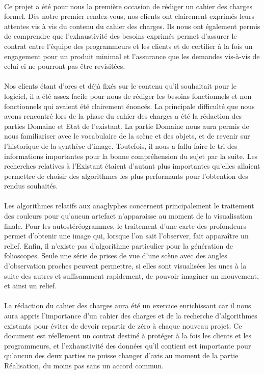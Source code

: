 \paragraph{}
Ce projet a été pour nous la première occasion de rédiger un cahier des charges formel. Dès notre premier rendez-vous, nos clients ont clairement exprimés leurs attentes vis à vis du contenu du cahier des charges. Ils nous ont également permis de comprendre que l'exhaustivité des besoins exprimés permet d'assurer le contrat entre l'équipe des programmeurs et les clients et de certifier à la fois un engagement pour un produit minimal et l'assurance que les demandes vis-à-vis de celui-ci ne pourront pas être revisitées.

\paragraph{}
Nos clients étant d'ores et déjà fixés sur le contenu qu'il souhaitait pour le logiciel, il a été assez facile pour nous de rédiger les besoins fonctionnels et non fonctionnels qui avaient été clairement énoncés. La principale difficulté que nous avons rencontré lors de la phase du cahier des charges a été la rédaction des parties Domaine et Etat de l'existant.
La partie Domaine nous aura permis de nous familiariser avec le vocabulaire de la scène et des objets, et de revenir sur l'historique de la synthèse d'image. Toutefois, il nous a fallu faire le tri des informations importantes pour la bonne compréhension du sujet par la suite.
Les recherches relatives à l'Existant étaient d'autant plus importantes qu'elles allaient permettre de choisir des algorithmes les plus performants pour l'obtention des rendus souhaités.

\paragraph{}
Les algorithmes relatifs aux anaglyphes concernent principalement le traitement des couleurs pour qu'aucun artefact n'apparaisse au moment de la visualisation finale. Pour les autostéréogrammes, le traitement d'une carte des profondeurs permet d'obtenir une image qui, lorsque l'on sait l'observer, fait apparaître un relief. Enfin, il n'existe pas d'algorithme particulier pour la génération de folioscopes. Seule une série de prises de vue d'une scène avec des angles d'observation proches peuvent permettre, si elles sont visualisées les unes à la suite des autres et suffisamment rapidement, de pouvoir imaginer un mouvement, et ainsi un relief.

\paragraph{}
La rédaction du cahier des charges aura été un exercice enrichissant car il nous aura appris l'importance d'un cahier des charges et de la recherche d'algorithmes existants pour éviter de devoir repartir de zéro à chaque nouveau projet. Ce document est réellement un contrat destiné à protéger à la fois les clients et les programmeurs, et l'exhaustivité des données qu'il contient est importante pour qu'aucun des deux parties ne puisse changer d'avis au moment de la partie Réalisation, du moins pas sans un accord commun.
